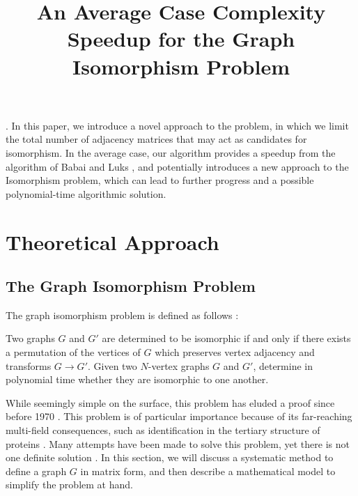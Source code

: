 \documentclass[12pt]{article}
\begin{document}
\title{An Average Case Complexity Speedup for the Graph Isomorphism Problem}
\date{}                                           %
\maketitle
\doublespacing
. In this paper, we introduce a novel approach to the problem, in which we limit the total number of adjacency matrices that may act as candidates for isomorphism. In the average case, our algorithm provides a speedup from the algorithm of Babai and Luks\cite{7} , and potentially introduces a new approach to the Isomorphism problem, which can lead to further progress and a possible polynomial-time algorithmic solution.
\clearpage

\section[Theory]{Theoretical Approach}
\subsection{The Graph Isomorphism Problem}
The graph isomorphism problem is defined as follows\cite{1}  :


\begin{adjustwidth}{3em}{0pt}
\singlespace
Two graphs $G$ and $G'$ are determined to be isomorphic if and only if there exists a permutation of the vertices of $G$ which preserves vertex adjacency and transforms $G \rightarrow G'$. Given two $N$-vertex graphs $G$ and $G'$, determine in polynomial time whether they are isomorphic to one another.
\end{adjustwidth}
\doublespace

While seemingly simple on the surface, this problem has eluded a proof since before 1970\cite{3} . This problem is of particular importance because of its far-reaching multi-field consequences, such as identification in the tertiary structure of proteins\cite{2} . Many attempts have been made to solve this problem, yet there is not one definite solution \cite{1,3,4,5,6,7} . In this section, we will discuss a systematic method to define a graph $G$ in matrix form, and then describe a mathematical model to simplify the problem at hand.
\end{document}
